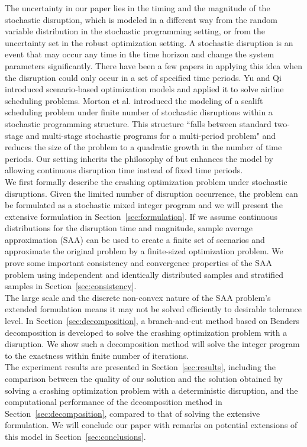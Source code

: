 \documentclass[11pt]{article}
\begin{document}
	The uncertainty in our paper lies in the timing and the magnitude of the stochastic disruption, which is modeled in a different way from the random variable distribution in the stochastic programming setting, or from the uncertainty set in the robust optimization setting. A stochastic disruption is an event that may occur any time in the time horizon and change the system parameters significantly. There have been a few papers in applying this idea when the disruption could only occur in a set of specified time periods. Yu and Qi \cite{yu2004disruptionmgt} introduced scenario-based optimization models and applied it to solve airline scheduling problems. Morton et al. \cite{morton2009sealift} introduced the modeling of a sealift scheduling problem under finite number of stochastic disruptions within a stochastic programming structure. This structure ``falls between standard two-stage and multi-stage stochastic programs for a multi-period problem" and reduces the size of the problem to a quadratic growth in the number of time periods. Our setting inherits the philosophy of \cite{morton2009sealift} but enhances the model by allowing continuous disruption time instead of fixed time periods.\\
	\newline
	We first formally describe the crashing optimization problem under stochastic disruptions. Given the limited number of disruption occurrence, the problem can be formulated as a stochastic mixed integer program and we will present the extensive formulation in Section~\ref{sec:formulation}. If we assume continuous distributions for the disruption time and magnitude, sample average approximation (SAA) can be used to create a finite set of scenarios and approximate the original problem by a finite-sized optimization problem. We prove some important consistency and convergence properties of the SAA problem using independent and identically distributed samples and stratified samples in Section~\ref{sec:consistency}.\\
	\newline
	The large scale and the discrete non-convex nature of the SAA problem's extended formulation means it may not be solved efficiently to desirable tolerance level. In Section~\ref{sec:decomposition}, a branch-and-cut method based on Benders decomposition is developed to solve the crashing optimization problem with a disruption. We show such a decomposition method will solve the integer program to the exactness within finite number of iterations.\\
	\newline
	The experiment results are presented in Section~\ref{sec:results}, including the comparison between the quality of our solution and the solution obtained by solving a  crashing optimization problem with a deterministic disruption, and the computational performance of the decomposition method in Section~\ref{sec:decomposition}, compared to that of solving the extensive formulation. We will conclude our paper with remarks on potential extensions of this model in Section~\ref{sec:conclusions}.
	
\end{document}
